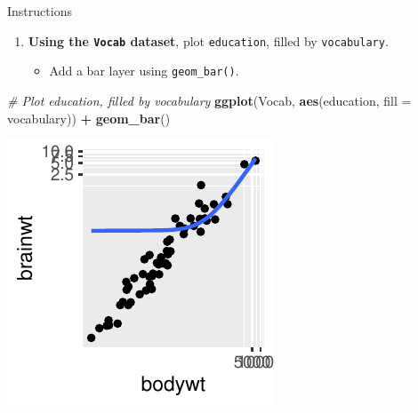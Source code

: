 \documentclass[
  ignorenonframetext,
]{beamer}
\newenvironment{Shaded}{\begin{snugshade}}{\end{snugshade}}
\newcommand{\AttributeTok}[1]{\textcolor[rgb]{0.13,0.29,0.53}{#1}}
\newcommand{\CommentTok}[1]{\textcolor[rgb]{0.56,0.35,0.01}{\textit{#1}}}
\newcommand{\FunctionTok}[1]{\textcolor[rgb]{0.13,0.29,0.53}{\textbf{#1}}}
\newcommand{\NormalTok}[1]{#1}
\newcommand{\SpecialCharTok}[1]{\textcolor[rgb]{0.81,0.36,0.00}{\textbf{#1}}}
\providecommand{\tightlist}{%
  \setlength{\itemsep}{0pt}\setlength{\parskip}{0pt}}
\begin{document}
\begin{frame}[fragile]{Instructions}
\label{instructions-8}
\begin{enumerate}
\tightlist
\item
  \textbf{Using the \texttt{Vocab} dataset}, plot \texttt{education},
  filled by \texttt{vocabulary}.

  \begin{itemize}
  \tightlist
  \item
    Add a bar layer using \texttt{geom\_bar()}.
  \end{itemize}
\end{enumerate}

\begin{Shaded}
\begin{Highlighting}[]
\CommentTok{\# Plot education, filled by vocabulary}
\FunctionTok{ggplot}\NormalTok{(Vocab, }\FunctionTok{aes}\NormalTok{(education, }\AttributeTok{fill =}\NormalTok{ vocabulary)) }\SpecialCharTok{+} \FunctionTok{geom\_bar}\NormalTok{()}
\end{Highlighting}
\end{Shaded}

\begin{center}\includegraphics[width=0.5\linewidth]{Figs/unnamed-chunk-52-1} \end{center}
\end{frame}
\end{document}
